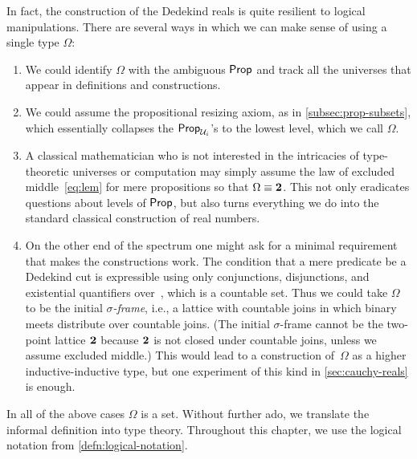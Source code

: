 In fact, the construction of the Dedekind reals is quite resilient to logical
manipulations. There are several ways in which we can make sense of using a single type
$\Omega$:
%
\begin{enumerate}

\item We could identify $\Omega$ with the ambiguous $\mathsf{Prop}$ and track all the universes
  that appear in definitions and constructions.

\item We could assume the propositional resizing axiom,
  as in \autoref{subsec:prop-subsets}, which essentially collapses the $\mathsf{Prop}_{\mathcal{U}_i}$'s to the
  lowest level, which we call $\Omega$.

\item A classical mathematician who is not interested in the intricacies of type-theoretic
  universes or computation may simply assume the law of excluded middle~\eqref{eq:lem} for
  mere propositions so that $\Omega \equiv \mathbf{2}$.
  This not only eradicates questions about
  levels of $\mathsf{Prop}$, but also turns everything we do into the standard classical
  construction of real numbers.

\item On the other end of the spectrum one might ask for a minimal requirement that makes
  the constructions work. The condition that a mere predicate be a Dedekind cut is
  expressible using only conjunctions, disjunctions, and existential quantifiers over~\Q, which
  is a countable set. Thus we could take $\Omega$ to be the initial \emph{$\sigma$-frame},
  i.e., a lattice with countable joins in which binary meets distribute over countable
  joins. (The initial $\sigma$-frame cannot be the two-point lattice $\mathbf{2}$ because
  $\mathbf{2}$ is not closed under countable joins, unless we assume excluded middle.) This
  would lead to a construction of~$\Omega$ as a higher inductive-inductive type, but one
  experiment of this kind in \autoref{sec:cauchy-reals} is enough.
\end{enumerate}

In all of the above cases $\Omega$ is a set.
%
Without further ado, we translate the informal definition into type theory.
Throughout this chapter, we use the
logical notation from \autoref{defn:logical-notation}.


